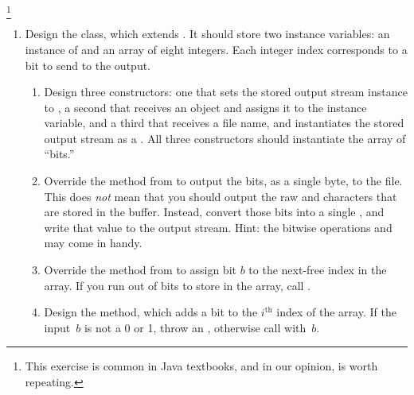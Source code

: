 \footnote{This exercise is common in Java textbooks, and in our opinion, is worth repeating.}

\begin{enumerate}[label=(\alph*)]
    \item Design the  class, which extends . It should store two instance variables: an instance of  and an array of eight integers. Each integer index corresponds to a bit to send to the output.
    \begin{enumerate}[label=(\roman*)]
        \item Design three  constructors: one that sets the stored output stream instance to , a second that receives an  object and assigns it to the instance variable, and a third that receives a file name, and instantiates the stored output stream as a . All three constructors should instantiate the array of ``bits.''
        \item Override the  method from  to output the bits, as a single byte, to the file. This does \emph{not} mean that you should output the raw \ttt{\q{}1\q{}} and \ttt{\q{}0\q{}} characters that are stored in the buffer. Instead, convert those bits into a single , and write that value to the output stream. Hint: the bitwise operations \ttt{<<} and \ttt{|} may come in handy.
        \item Override the  method from  to assign bit $b$ to the next-free index in the array. If you run out of bits to store in the array, call . 
        \item Design the  method, which adds a bit to the $i^\text{th}$ index of the array. If the input~$b$ is not a 0 or 1, throw an , otherwise call  with~$b$.
    \end{enumerate}


\end{enumerate}
